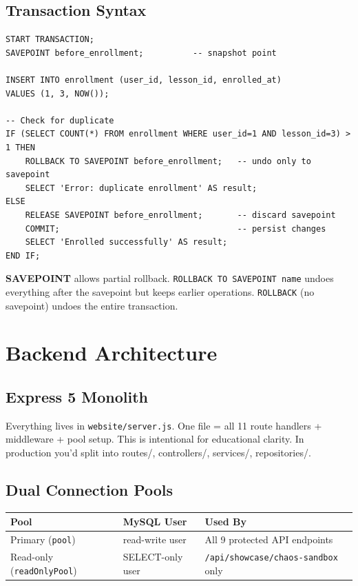 \documentclass[11pt,a4paper]{article}
\newcommand{\T}[1]{\texttt{#1}}          %
\begin{document}
\subsection{Transaction Syntax}

\begin{lstlisting}[style=sql]
START TRANSACTION;
SAVEPOINT before_enrollment;          -- snapshot point

INSERT INTO enrollment (user_id, lesson_id, enrolled_at)
VALUES (1, 3, NOW());

-- Check for duplicate
IF (SELECT COUNT(*) FROM enrollment WHERE user_id=1 AND lesson_id=3) > 1 THEN
    ROLLBACK TO SAVEPOINT before_enrollment;   -- undo only to savepoint
    SELECT 'Error: duplicate enrollment' AS result;
ELSE
    RELEASE SAVEPOINT before_enrollment;       -- discard savepoint
    COMMIT;                                    -- persist changes
    SELECT 'Enrolled successfully' AS result;
END IF;
\end{lstlisting}

\begin{keybox}
\textbf{SAVEPOINT} allows partial rollback. \T{ROLLBACK TO SAVEPOINT name} undoes
everything after the savepoint but keeps earlier operations.
\T{ROLLBACK} (no savepoint) undoes the entire transaction.
\end{keybox}

\section{Backend Architecture}

\subsection{Express 5 Monolith}

Everything lives in \T{website/server.js}. One file = all 11 route handlers + middleware
+ pool setup. This is intentional for educational clarity. In production you'd split
into routes/, controllers/, services/, repositories/.

\subsection{Dual Connection Pools}

\begin{center}
\renewcommand{\arraystretch}{1.3}
\begin{tabular}{@{}p{3.5cm}p{3.5cm}p{5.5cm}@{}}
\toprule
\textbf{Pool} & \textbf{MySQL User} & \textbf{Used By} \\
\midrule
Primary (\T{pool})         & read-write user & All 9 protected API endpoints \\
Read-only (\T{readOnlyPool}) & SELECT-only user & \T{/api/showcase/chaos-sandbox} only \\
\bottomrule
\end{tabular}
\end{center}
\end{document}
